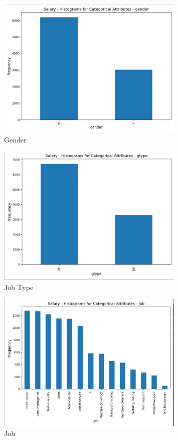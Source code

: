 \documentclass[a4paper,12pt]{article}
\begin{document}
\begin{figure}[H]
    \centering
    \includegraphics[width=0.8\textwidth]{Resources/histogram_gender.jpeg}
    \caption{Gender}
\end{figure}

\begin{figure}[H]
    \centering
    \includegraphics[width=0.8\textwidth]{Resources/histogram_gtype.jpeg}
    \caption{Job Type}
\end{figure}

\begin{figure}[H]
    \centering
    \includegraphics[width=0.8\textwidth]{Resources/histogram_job.jpeg}
    \caption{Job}
\end{figure}
\end{document}
